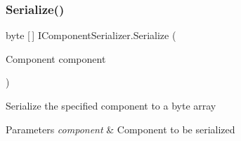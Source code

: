\mbox{\label{interface_i_component_serializer_ab2aa38005665496b62d6c54b5f0dbd31}} 
\subsubsection{\texorpdfstring{Serialize()}{Serialize()}}
{\footnotesize\ttfamily byte \mbox{[}$\,$\mbox{]} I\+Component\+Serializer.\+Serialize (\begin{DoxyParamCaption}\item[{Component}]{component }\end{DoxyParamCaption})}



Serialize the specified component to a byte array 


\begin{DoxyParams}{Parameters}
{\em component} & Component to be serialized \\
\hline
\end{DoxyParams}


